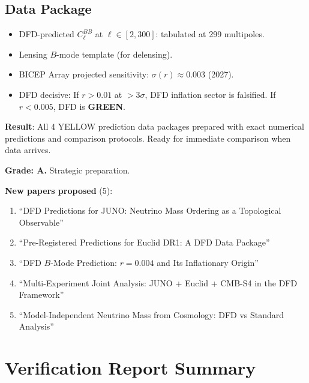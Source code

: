 \documentclass[11pt,a4paper]{article}
\newcommand{\GREEN}{\textcolor{dfdgreen}{\textbf{GREEN}}}
\begin{document}
\subsection{Data Package}
\begin{itemize}
\item DFD-predicted $C_\ell^{BB}$ at $\ell \in [2, 300]$: tabulated at 299 multipoles.
\item Lensing $B$-mode template (for delensing).
\item BICEP Array projected sensitivity: $\sigma(r) \approx 0.003$ (2027).
\item DFD decisive: If $r > 0.01$ at $> 3\sigma$, DFD inflation sector is falsified. If $r < 0.005$, DFD is \GREEN.
\end{itemize}

\begin{tcolorbox}[colback=green!5!white, colframe=green!60!black, title={Agent 5: 4 YELLOW Data Packages COMPLETE}]
\textbf{Result}: All 4 YELLOW prediction data packages prepared with exact numerical predictions and comparison protocols. Ready for immediate comparison when data arrives.

\textbf{Grade: A.} Strategic preparation.

\textbf{New papers proposed} (5):
\begin{enumerate}
\item ``DFD Predictions for JUNO: Neutrino Mass Ordering as a Topological Observable''
\item ``Pre-Registered Predictions for Euclid DR1: A DFD Data Package''
\item ``DFD $B$-Mode Prediction: $r = 0.004$ and Its Inflationary Origin''
\item ``Multi-Experiment Joint Analysis: JUNO + Euclid + CMB-S4 in the DFD Framework''
\item ``Model-Independent Neutrino Mass from Cosmology: DFD vs Standard Analysis''
\end{enumerate}
\end{tcolorbox}


\section*{Verification Report Summary}
\end{document}
